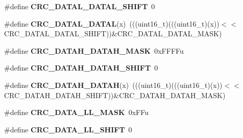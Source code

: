\begin{DoxyCompactItemize}
\item 
\#define {\bfseries C\+R\+C\+\_\+\+D\+A\+T\+A\+L\+\_\+\+D\+A\+T\+A\+L\+\_\+\+S\+H\+I\+FT}~0\hypertarget{group__CRC__Register__Masks_ga99d9068960a7ec56ab525b22628d74ee}{}\label{group__CRC__Register__Masks_ga99d9068960a7ec56ab525b22628d74ee}

\item 
\#define {\bfseries C\+R\+C\+\_\+\+D\+A\+T\+A\+L\+\_\+\+D\+A\+T\+AL}(x)~(((uint16\+\_\+t)(((uint16\+\_\+t)(x))$<$$<$C\+R\+C\+\_\+\+D\+A\+T\+A\+L\+\_\+\+D\+A\+T\+A\+L\+\_\+\+S\+H\+I\+FT))\&C\+R\+C\+\_\+\+D\+A\+T\+A\+L\+\_\+\+D\+A\+T\+A\+L\+\_\+\+M\+A\+SK)\hypertarget{group__CRC__Register__Masks_ga5aa800e3872374aae006a458ac46e48e}{}\label{group__CRC__Register__Masks_ga5aa800e3872374aae006a458ac46e48e}

\item 
\#define {\bfseries C\+R\+C\+\_\+\+D\+A\+T\+A\+H\+\_\+\+D\+A\+T\+A\+H\+\_\+\+M\+A\+SK}~0x\+F\+F\+F\+Fu\hypertarget{group__CRC__Register__Masks_ga8d8b84bf7b81a4943bfe4d92eea7a83d}{}\label{group__CRC__Register__Masks_ga8d8b84bf7b81a4943bfe4d92eea7a83d}

\item 
\#define {\bfseries C\+R\+C\+\_\+\+D\+A\+T\+A\+H\+\_\+\+D\+A\+T\+A\+H\+\_\+\+S\+H\+I\+FT}~0\hypertarget{group__CRC__Register__Masks_ga2820b1c312342051ef13af454924dd6a}{}\label{group__CRC__Register__Masks_ga2820b1c312342051ef13af454924dd6a}

\item 
\#define {\bfseries C\+R\+C\+\_\+\+D\+A\+T\+A\+H\+\_\+\+D\+A\+T\+AH}(x)~(((uint16\+\_\+t)(((uint16\+\_\+t)(x))$<$$<$C\+R\+C\+\_\+\+D\+A\+T\+A\+H\+\_\+\+D\+A\+T\+A\+H\+\_\+\+S\+H\+I\+FT))\&C\+R\+C\+\_\+\+D\+A\+T\+A\+H\+\_\+\+D\+A\+T\+A\+H\+\_\+\+M\+A\+SK)\hypertarget{group__CRC__Register__Masks_ga1a935b7a0739c9353ea1db915d15098f}{}\label{group__CRC__Register__Masks_ga1a935b7a0739c9353ea1db915d15098f}

\item 
\#define {\bfseries C\+R\+C\+\_\+\+D\+A\+T\+A\+\_\+\+L\+L\+\_\+\+M\+A\+SK}~0x\+F\+Fu\hypertarget{group__CRC__Register__Masks_gab3fd3443e50946adc0be6c46cfac2b4d}{}\label{group__CRC__Register__Masks_gab3fd3443e50946adc0be6c46cfac2b4d}

\item 
\#define {\bfseries C\+R\+C\+\_\+\+D\+A\+T\+A\+\_\+\+L\+L\+\_\+\+S\+H\+I\+FT}~0\hypertarget{group__CRC__Register__Masks_gaf8ecef51d22d384bc8ab987dfb808f49}{}\label{group__CRC__Register__Masks_gaf8ecef51d22d384bc8ab987dfb808f49}


\end{DoxyCompactItemize}
